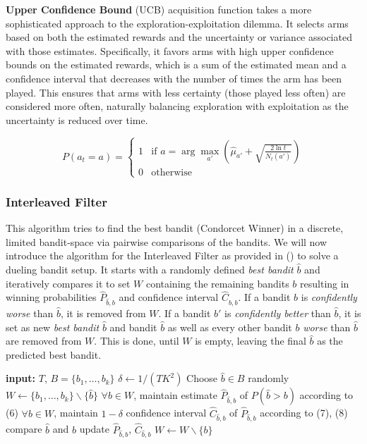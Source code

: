 \documentclass[
  letterpaper,
  numbers=noenddot,
  DIV=11]{scrreprt}
\theoremstyle{plain}
\theoremstyle{definition}
\theoremstyle{remark}
\begin{document}
\textbf{Upper Confidence Bound} (UCB) acquisition function takes a more
sophisticated approach to the exploration-exploitation dilemma. It
selects arms based on both the estimated rewards and the uncertainty or
variance associated with those estimates. Specifically, it favors arms
with high upper confidence bounds on the estimated rewards, which is a
sum of the estimated mean and a confidence interval that decreases with
the number of times the arm has been played. This ensures that arms with
less certainty (those played less often) are considered more often,
naturally balancing exploration with exploitation as the uncertainty is
reduced over time.

\[P(a_t = a) =
\begin{cases} 
1 & \text{if } a = \arg\max_{a'} \left( \hat{\mu}_{a'} + \sqrt{\frac{2 \ln t}{N_t(a')}} \right) \\
0 & \text{otherwise}
\end{cases}\]

\subsubsection{Interleaved Filter}\label{interleaved-filter}

This algorithm tries to find the best bandit (Condorcet Winner) in a
discrete, limited bandit-space via pairwise comparisons of the bandits.
We will now introduce the algorithm for the Interleaved Filter as
provided in () to solve a
dueling bandit setup. It starts with a randomly defined \emph{best
bandit} \(\hat{b}\) and iteratively compares it to set \(W\) containing
the remaining bandits \(b\) resulting in winning probabilities
\(\hat{P}_{\hat{b},b}\) and confidence interval \(\hat{C}_{\hat{b},b}\).
If a bandit \(b\) is \emph{confidently worse} than \(\hat{b}\), it is
removed from \(W\). If a bandit \(b'\) is \emph{confidently better} than
\(\hat{b}\), it is set as new \emph{best bandit} \(\hat{b}\) and bandit
\(\hat{b}\) as well as every other bandit \(b\) \emph{worse} than
\(\hat{b}\) are removed from \(W\). This is done, until \(W\) is empty,
leaving the final \(\hat{b}\) as the predicted best bandit.

\textbf{input:} \(T\), \(B=\{b_1, \dots, b_k\}\)
\(\delta \gets 1/(TK^2)\) Choose \(\hat{b} \in B\) randomly
\(W \gets \{b_1, \dots, b_k\} \backslash \{\hat{b}\}\)
\(\forall b \in W\), maintain estimate \(\hat{P}_{\hat{b},b}\) of
\(P(\hat{b} > b)\) according to (6) \(\forall b \in W\), maintain
\(1 - \delta\) confidence interval \(\hat{C}_{\hat{b},b}\) of
\(\hat{P}_{\hat{b},b}\) according to (7), (8) compare \(\hat{b}\) and
\(b\) update \(\hat{P}_{\hat{b},b}\), \(\hat{C}_{\hat{b},b}\)
\(W \gets W \backslash \{b\}\)
\end{document}
